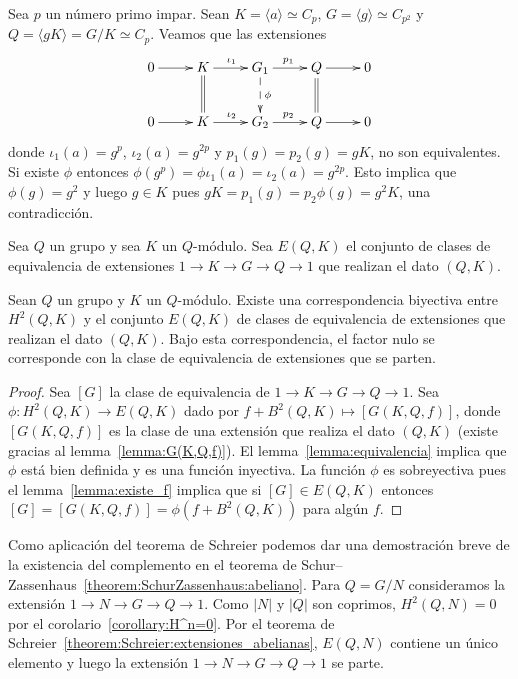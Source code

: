 \begin{example}
	Sea $p$ un número primo impar. Sean $K=\langle a\rangle\simeq C_p$, $G=\langle
	g\rangle\simeq C_{p^2}$ y $Q=\langle gK\rangle=G/K\simeq C_p$.  Veamos que
	las extensiones
	\[
	\xymatrix{
	0\ar[r] 
	& K
	\ar@{=}[d]
	\ar[r]^{\iota_1}
	& G_1
	\ar[r]^{p_1}
	\ar@{-->}[d]^\phi
	& Q\ar[r]
	\ar@{=}[d]
	& 0
	\\
	0\ar[r] 
	& K
	\ar[r]^{\iota_2}
	& G_2
	\ar[r]^{p_2}
	& Q\ar[r]
	& 0
	}
	\]
	donde $\iota_1(a)=g^p$, $\iota_2(a)=g^{2p}$ y $p_1(g)=p_2(g)=gK$, no son
	equivalentes. Si existe $\phi$ entonces
	$\phi(g^p)=\phi\iota_1(a)=\iota_2(a)=g^{2p}$. Esto implica que
	$\phi(g)=g^2$ y luego $g\in K$ pues $gK=p_1(g)=p_2\phi(g)=g^2K$, una
	contradicción. 
\end{example}

Sea $Q$ un grupo y sea $K$ un $Q$-módulo. Sea $E(Q,K)$ el conjunto de clases de
equivalencia de extensiones $1\to K\to G\to Q\to 1$ que realizan el dato $(Q,K)$. 

\begin{theorem}[Schreier]
	\label{theorem:Schreier:extensiones_abelianas}
	Sean $Q$ un grupo y $K$ un $Q$-módulo.  Existe una correspondencia
	biyectiva entre $H^2(Q,K)$ y el conjunto $E(Q,K)$ de clases de equivalencia
	de extensiones que realizan el dato $(Q,K)$. Bajo esta correspondencia, el
	factor nulo se corresponde con la clase de equivalencia de extensiones que
	se parten.
\end{theorem}

\begin{proof}
	Sea $[G]$ la clase de equivalencia de $1\to K\to G\to Q\to 1$. Sea
	$\phi\colon H^2(Q,K)\to E(Q,K)$ dado por $f+B^2(Q,K)\mapsto [G(K,Q,f)]$,
	donde $[G(K,Q,f)]$ es la clase de una extensión que realiza el dato $(Q,K)$
	(existe gracias al lemma~\ref{lemma:G(K,Q,f)}). El
	lemma~\ref{lemma:equivalencia} implica que $\phi$ está bien definida y es
	una función inyectiva. La función $\phi$ es sobreyectiva pues el
	lemma~\ref{lemma:existe_f} implica que si $[G]\in E(Q,K)$ entonces
	$[G]=[G(K,Q,f)]=\phi(f+B^2(Q,K))$ para algún $f$. %
\end{proof}

\begin{remark}
	Como aplicación del teorema de Schreier podemos dar una demostración breve
	de la existencia del complemento en el teorema de
	Schur--Zassenhaus~\ref{theorem:SchurZassenhaus:abeliano}.  Para $Q=G/N$
	consideramos la extensión $1\to N\to G\to Q\to 1$. Como $|N|$ y $|Q|$ son
	coprimos, $H^2(Q,N)=0$ por el corolario~\ref{corollary:H^n=0}.  Por el
	teorema de Schreier~\ref{theorem:Schreier:extensiones_abelianas}, $E(Q,N)$
	contiene un único elemento y luego la extensión $1\to N\to G\to Q\to 1$ se
	parte.
\end{remark}

